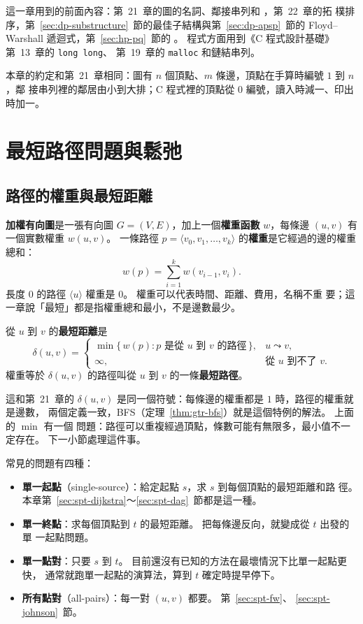 這一章用到的前面內容：第~21~章的圖的名詞、鄰接串列和 ，第~22~章的拓
樸排序，第~\ref{sec:dp-substructure}~節的最佳子結構與第~\ref{sec:dp-apsp}~節的 Floyd--Warshall
遞迴式，第~\ref{sec:hp-pq}~節的 。 程式方面用到《C 程式設計基礎》第~13~章的 \texttt{long long}、
第~19~章的 \texttt{malloc} 和鏈結串列。

本章的約定和第~21~章相同：圖有 $n$ 個頂點、$m$ 條邊，頂點在手算時編號 $1$ 到 $n$，鄰
接串列裡的鄰居由小到大排；C 程式裡的頂點從 $0$ 編號，讀入時減一、印出時加一。

\section{最短路徑問題與鬆弛}
\label{sec:spt-relax}

\subsection{路徑的權重與最短距離}

\textbf{加權有向圖}是一張有向圖 $G = (V, E)$，加上一個\textbf{權重函數} $w$，每條邊
$(u, v)$ 有一個實數權重 $w(u, v)$。 一條路徑 $p = \langle v_0, v_1, \ldots, v_k
\rangle$ 的\textbf{權重}是它經過的邊的權重總和：
\[
w(p) = \sum_{i=1}^{k} w(v_{i-1}, v_i).
\]
長度 $0$ 的路徑 $\langle u \rangle$ 權重是 $0$。 權重可以代表時間、距離、費用，名稱不重
要；這一章說「最短」都是指權重總和最小，不是邊數最少。

\begin{definition}[最短距離]
\label{def:spt-delta}
從 $u$ 到 $v$ 的\textbf{最短距離}是
\[
\delta(u, v) = \begin{cases}
\min\{\, w(p) : p \text{ 是從 } u \text{ 到 } v \text{ 的路徑} \,\}, & u \leadsto v, \\
\infty, & \text{從 } u \text{ 到不了 } v.
\end{cases}
\]
權重等於 $\delta(u, v)$ 的路徑叫從 $u$ 到 $v$ 的一條\textbf{最短路徑}。
\end{definition}

這和第~21~章的 $\delta(u, v)$ 是同一個符號：每條邊的權重都是 $1$ 時，路徑的權重就是邊數，
兩個定義一致，BFS（定理~\ref{thm:gtr-bfs}）就是這個特例的解法。 上面的 $\min$ 有一個
問題：路徑可以重複經過頂點，條數可能有無限多，最小值不一定存在。 下一小節處理這件事。

常見的問題有四種：
\begin{itemize}
\item \textbf{單一起點}（single-source）：給定起點 $s$，求 $s$ 到每個頂點的最短距離和路
徑。 本章第~\ref{sec:spt-dijkstra}～\ref{sec:spt-dag}~節都是這一種。
\item \textbf{單一終點}：求每個頂點到 $t$ 的最短距離。 把每條邊反向，就變成從 $t$ 出發的單
一起點問題。
\item \textbf{單一點對}：只要 $s$ 到 $t$。 目前還沒有已知的方法在最壞情況下比單一起點更快，
通常就跑單一起點的演算法，算到 $t$ 確定時提早停下。
\item \textbf{所有點對}（all-pairs）：每一對 $(u, v)$ 都要。 第~\ref{sec:spt-fw}、
\ref{sec:spt-johnson}~節。
\end{itemize}

